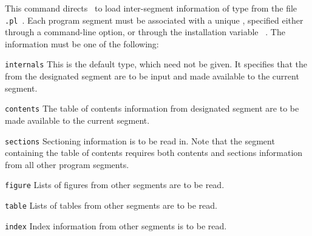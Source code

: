 \begin{htmllist}
%
\item [ \Lc{internal[}\Meta{type}\texttt{]\char123}%
 \Meta{prefix}\texttt{\char125}\label{internal}]
%
This command directs \latextohtml\ to load inter-segment information 
of type  from the file \texttt{.pl}~.  
Each program segment must be associated with a unique , 
specified either through a command-line option, 
or through the installation variable ~.
The information  must be one of the following:
%
\begin{htmllist}\addtolength{\leftskip}{15pt}%
%
%
%
\item[\texttt{internals}]  
This is the default type, which need not be
        given.  It specifies that the
         from the
        designated segment are to be input and made available
        to the current segment.  
\html{\\}%
%
%
\item[\texttt{contents}]  
The table of contents information from
        designated segment are to be made available to the
        current segment.
\html{\\}%
%
%
\item[\texttt{sections}]  
Sectioning information is to be read in.
        Note that the segment containing the table of contents
        requires both contents and sections information
        from all other program segments.
\html{\\}%
%
%
%
\item[\texttt{figure}]  
Lists of figures from other segments are to be read.
\html{\\}%
%
%
%
\item[\texttt{table}] 
Lists of tables from other segments are to be read.
\html{\\}%
%
%
\item[\texttt{index}] 
Index information from other segments is to be read.
\html{\\}%

\end{htmllist}
\end{htmllist}
